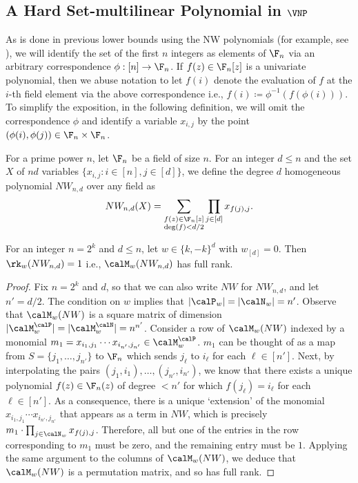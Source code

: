 \documentclass{article}
\begin{document}
\subsection{A Hard Set-multilinear Polynomial in $\VNP$}\label{subsec:NW}
As is done in previous lower bounds using the NW polynomials (for example, see \cite{KayalSS14}), we will identify the set of the first $n$ integers as elements of $\F_n$ via an arbitrary correspondence $\phi : [n] \rightarrow \F_n$. If $f(z) \in \F_n[z]$ is a univariate polynomial, then we abuse notation to let $f(i)$ denote the evaluation
of $f$ at the $i$-th field element via the above correspondence i.e., $f(i)\coloneqq \phi^{-1}
(f(\phi(i)))$. To simplify the exposition, in the following definition, we will omit the correspondence $\phi$ and identify a variable
$x_{i,j}$ by the point $(\phi(i), \phi(j)) \in \F_n \times \F_n$.

\begin{definition}\label{def:NW}
For a prime power $n$,
let $\F_n$ be a field of size $n$. For an integer $d\leq n$ and the set $X$ of $nd$ variables
$\{x_{i,j} : i\in[n], j \in [d]\}$, we define the degree $d$
homogeneous polynomial $NW_{n,d}$ over any field as
\[
NW_{n,d}(X) = \sum_{\substack{f(z)\in\F_n[z]
\\ \deg(f)<d/2}} \prod_{j\in[d]} x_{f(j),j}.
\]
\end{definition}

\begin{claim}\label{clm:NW-full-rk}
For an integer $n = 2^k$ and $d\leq n$, let $w \in \{k,-k\}^d$ with $w_{[d]} = 0$. Then $\rk_w(NW_{n,d}) = 1$ i.e., $\calM_w(NW_{n,d})$ has full rank.
\end{claim}
\begin{proof}
Fix $n = 2^k$ and $d$, so that we can also write $NW$ for $NW_{n,d}$, and let $n' = d/2$. The condition on $w$ implies that $|\calP_w| = |\calN_w| = n'$. Observe that $\calM_w(NW)$ is a square matrix of dimension $|\calM^{\calP}_{w}| = |\calM^{\calN}_{w}| = n^{n'}$. Consider a row of $\calM_w(NW)$ indexed by a monomial $m_1 = x_{i_1,j_1}\cdots x_{i_{n'},j_{n'}}\in \calM^{\calP}_{w}$. $m_1$ can be thought of as a map from $S = \{j_1,\ldots,j_{n'}\}$ to $\F_n$ which sends $j_\ell$ to $i_\ell$ for each $\ell \in [n']$. Next, by interpolating the pairs $(j_1,i_1),\ldots, (j_{n'},i_{n'})$, we know that there exists a unique polynomial $f(z)\in \F_n(z)$ of degree $<n'$ for which $f(j_\ell) = i_\ell$ for each $\ell\in [n']$. As a consequence, there is a unique `extension' of the monomial $x_{i_1,j_1}\cdots x_{i_{n'},j_{n'}}$ that appears as a term in $NW$, which is precisely $m_1\cdot \prod_{j\in \calN_w}x_{f(j),j}$. Therefore,
all but one of the entries in the row corresponding to $m_1$ must be zero, and the remaining entry must be $1$. Applying the same argument to the columns of $\calM_w(NW)$, we deduce that $\calM_w(NW)$ is a permutation matrix, and so has full rank.
\end{proof}
\end{document}
